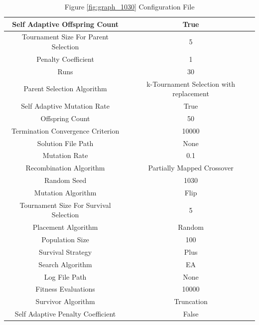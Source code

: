 \documentclass{standalone}
\begin{document}
\begin{table}[!htb]
	\centering
	\caption{Figure \ref{fig:graph_1030} Configuration File}
	\label{tab:graph_1030}
	\begin{tabular}{| c | c |}
		\hline
		Self Adaptive Offspring Count		& True		 \\
		\hline
		Tournament Size For Parent Selection		& 5		 \\
		\hline
		Penalty Coefficient		& 1		 \\
		\hline
		Runs		& 30		 \\
		\hline
		Parent Selection Algorithm		& k-Tournament Selection with replacement		 \\
		\hline
		Self Adaptive Mutation Rate		& True		 \\
		\hline
		Offspring Count		& 50		 \\
		\hline
		Termination Convergence Criterion		& 10000		 \\
		\hline
		Solution File Path		& None		 \\
		\hline
		Mutation Rate		& 0.1		 \\
		\hline
		Recombination Algorithm		& Partially Mapped Crossover		 \\
		\hline
		Random Seed		& 1030		 \\
		\hline
		Mutation Algorithm		& Flip		 \\
		\hline
		Tournament Size For Survival Selection		& 5		 \\
		\hline
		Placement Algorithm		& Random		 \\
		\hline
		Population Size		& 100		 \\
		\hline
		Survival Strategy		& Plus		 \\
		\hline
		Search Algorithm		& EA		 \\
		\hline
		Log File Path		& None		 \\
		\hline
		Fitness Evaluations		& 10000		 \\
		\hline
		Survivor Algorithm		& Truncation		 \\
		\hline
		Self Adaptive Penalty Coefficient		& False		 \\
		\hline
	\end{tabular}
\end{table}
\end{document}
